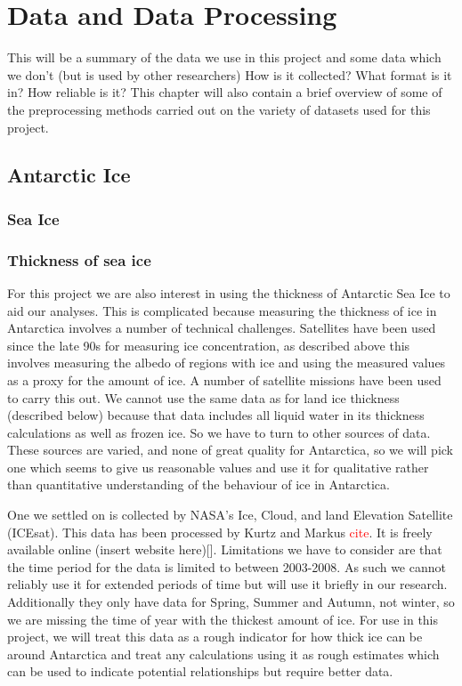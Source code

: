 \documentclass[../main.tex]{subfiles}
\begin{document}
\chapter{Data and Data Processing}
\label{chap:data}
This will be a summary of the data we use in this project and some data which we don't (but is used by other researchers)
How is it collected? What format is it in?
How reliable is it?
This chapter will also contain a brief overview of some of the preprocessing methods carried out on the variety of datasets used for this project. 



\section{Antarctic Ice}
\subsection*{Sea Ice}

\subsection*{Thickness of sea ice}
For this project we are also interest in using the thickness of Antarctic Sea Ice to aid our analyses. This is complicated because measuring the thickness of ice in Antarctica involves a number of technical challenges. Satellites have been used since the late 90s for measuring ice concentration, as described above this involves measuring the albedo of regions with ice and using the measured values as a proxy for the amount of ice. A number of satellite missions have been used to carry this out. We cannot use the same data as for land ice thickness (described below) because that data includes all liquid water in its thickness calculations as well as frozen ice. So we have to turn to other sources of data. These sources are varied, and none of great quality for Antarctica, so we will pick one which seems to give us reasonable values and use it for qualitative rather than quantitative understanding of the behaviour of ice in Antarctica.

One we settled on is collected by NASA's Ice, Cloud, and land Elevation Satellite (ICEsat). This data has been processed by Kurtz and Markus \textcolor{red}{cite}. It is freely available online (insert website here)[]. Limitations we have to consider are that the time period for the data is limited to between 2003-2008. As such we cannot reliably use it for extended periods of time but will use it briefly in our research. Additionally they only have data for Spring, Summer and Autumn, not winter, so we are missing the time of year with the thickest amount of ice.  For use in this project, we will treat this data as a rough indicator for how thick ice can be around Antarctica and treat any calculations using it as rough estimates which can be used to indicate potential relationships but require better data.
\end{document}
